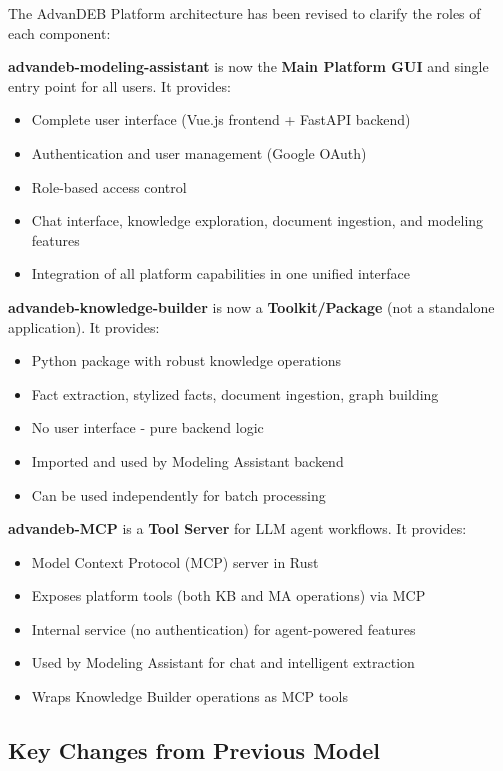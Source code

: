 \documentclass[12pt,a4paper]{article}
\begin{document}
The AdvanDEB Platform architecture has been revised to clarify the roles of each component:

\textbf{advandeb-modeling-assistant} is now the \textbf{Main Platform GUI} and single entry point for all users. It provides:
\begin{itemize}[noitemsep]
    \item Complete user interface (Vue.js frontend + FastAPI backend)
    \item Authentication and user management (Google OAuth)
    \item Role-based access control
    \item Chat interface, knowledge exploration, document ingestion, and modeling features
    \item Integration of all platform capabilities in one unified interface
\end{itemize}

\textbf{advandeb-knowledge-builder} is now a \textbf{Toolkit/Package} (not a standalone application). It provides:
\begin{itemize}[noitemsep]
    \item Python package with robust knowledge operations
    \item Fact extraction, stylized facts, document ingestion, graph building
    \item No user interface - pure backend logic
    \item Imported and used by Modeling Assistant backend
    \item Can be used independently for batch processing
\end{itemize}

\textbf{advandeb-MCP} is a \textbf{Tool Server} for LLM agent workflows. It provides:
\begin{itemize}[noitemsep]
    \item Model Context Protocol (MCP) server in Rust
    \item Exposes platform tools (both KB and MA operations) via MCP
    \item Internal service (no authentication) for agent-powered features
    \item Used by Modeling Assistant for chat and intelligent extraction
    \item Wraps Knowledge Builder operations as MCP tools
\end{itemize}

\subsection{Key Changes from Previous Model}
\end{document}
